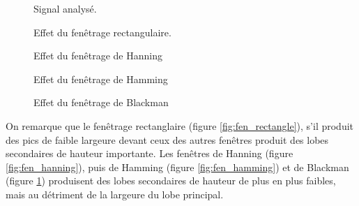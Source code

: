 \documentclass[french]{article}
\begin{document}
  
\begin{figure}[h!]
	\centering
	\begin{minipage}{\textwidth}
		\centering
		
		\caption{Signal analysé.}
		\label{fig:fen_signal}
	\end{minipage}
  	\begin{minipage}{\textwidth}
  		\centering
  		
  		\caption{Effet du fenêtrage rectangulaire.}
  		\label{fig:fen_rectangle}
  	\end{minipage}
  	\begin{minipage}{\textwidth}
  		\centering
  		
  		\caption{Effet du fenêtrage de Hanning}
  		\label{fig:fen_hanning}
	\end{minipage}
	\begin{minipage}{\textwidth}
		\centering
		
		\caption{Effet du fenêtrage de Hamming}
		\label{fig:fen_hamming}
	\end{minipage}
	\begin{minipage}{\textwidth}
		\centering
		
		\caption{Effet du fenêtrage de Blackman}
		\label{fig:fen_blackman}
	\end{minipage}
\end{figure}

On remarque que le fenêtrage rectanglaire (figure \ref{fig:fen_rectangle}), s'il produit des pics de faible largeure devant ceux des autres fenêtres produit des lobes secondaires de hauteur importante. Les fenêtres de Hanning (figure \ref{fig:fen_hanning}), puis de Hamming (figure \ref{fig:fen_hamming}) et de Blackman (figure \ref{fig:fen_blackman}) produisent des lobes secondaires de hauteur de plus en plus faibles, mais au détriment de la largeure du lobe principal.
\end{document}
